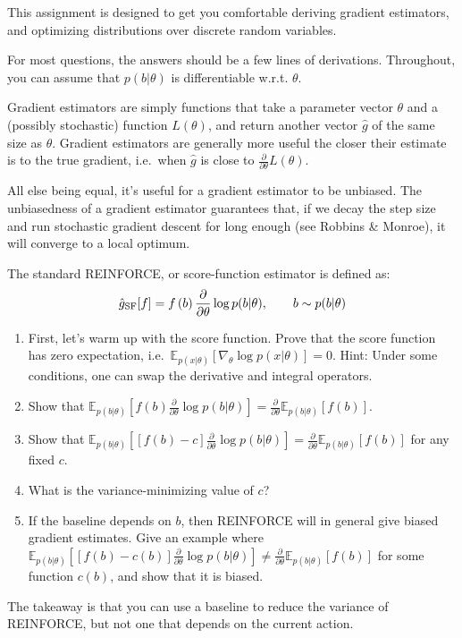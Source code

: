 \documentclass{harvardml}
\newcommand{\E}{\mathbb{E}}
\newcommand{\PT}{\frac{\partial}{\partial \theta}}
\theoremstyle{plain}
\begin{document}
This assignment is designed to get you comfortable deriving gradient estimators, and optimizing distributions over discrete random variables.

For most questions, the answers should be a few lines of derivations.
Throughout, you can assume that $p(b|\theta)$ is differentiable w.r.t. $\theta$.


\begin{problem}

Gradient estimators are simply functions that take a parameter vector $\theta$ and a (possibly stochastic) function $L(\theta)$, and return another vector $\hat g$ of the same size as $\theta$.
Gradient estimators are generally more useful the closer their estimate is to the true gradient, i.e.\ when $\hat g$ is close to $\PT L(\theta)$.

All else being equal, it's useful for a gradient estimator to be unbiased.
The unbiasedness of a gradient estimator guarantees that, if we decay the step size and run stochastic gradient descent for long enough (see Robbins \& Monroe), it will converge to a local optimum.

The standard REINFORCE, or score-function estimator is defined as:
%
\begin{align}
\hat g_\textnormal{SF}[f] = f \left( b \right) \PT \log p(b | \theta), \qquad b \sim p(b | \theta)
\end{align}
%
%
\begin{enumerate}[label=(\alph*)]
\item First, let's warm up with the score function.  Prove that the score function has zero expectation, i.e.\ $\E_{p(x|\theta)} \left[ \nabla_\theta \log p(x|\theta) \right] = 0$.
Hint: Under some conditions, one can swap the derivative and integral operators.

\item Show that $\E_{p(b|\theta)} \left[ f(b) \PT \log p(b | \theta) \right] = \PT \E_{p(b|\theta)} \left[ f(b) \right]$.

\item Show that $\E_{p(b|\theta)} \left[ [f(b) - c] \PT \log p(b | \theta) \right] = \PT \E_{p(b|\theta)} \left[ f(b) \right]$ for any fixed $c$.

\item What is the variance-minimizing value of $c$?

\item If the baseline depends on $b$, then REINFORCE will in general give biased gradient estimates.
Give an example where $\E_{p(b|\theta)} \left[ [f(b) - c(b)] \PT \log p(b | \theta) \right] \neq \PT \E_{p(b|\theta)}\left[ f(b) \right]$ for some function $c(b)$, and show that it is biased.
\end{enumerate}

The takeaway is that you can use a baseline to reduce the variance of REINFORCE, but not one that depends on the current action.
\end{problem}
\end{document}
